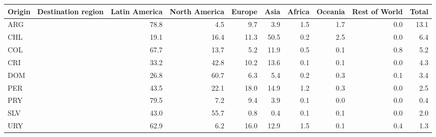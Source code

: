 \begin{tabular}{lrrrrrrrr}
\toprule
Origin \ Destination region & Latin America & North America & Europe & Asia & Africa & Oceania & Rest of World & Total \\
\midrule
ARG & 78.8 & 4.5 & 9.7 & 3.9 & 1.5 & 1.7 & 0.0 & 13.1 \\
CHL & 19.1 & 16.4 & 11.3 & 50.5 & 0.2 & 2.5 & 0.0 & 6.4 \\
COL & 67.7 & 13.7 & 5.2 & 11.9 & 0.5 & 0.1 & 0.8 & 5.2 \\
CRI & 33.2 & 42.8 & 10.2 & 13.6 & 0.1 & 0.1 & 0.0 & 4.3 \\
DOM & 26.8 & 60.7 & 6.3 & 5.4 & 0.2 & 0.3 & 0.1 & 3.4 \\
PER & 43.5 & 22.1 & 18.0 & 14.9 & 1.2 & 0.3 & 0.0 & 2.5 \\
PRY & 79.5 & 7.2 & 9.4 & 3.9 & 0.1 & 0.0 & 0.0 & 0.4 \\
SLV & 43.0 & 55.7 & 0.8 & 0.4 & 0.1 & 0.1 & 0.0 & 2.0 \\
URY & 62.9 & 6.2 & 16.0 & 12.9 & 1.5 & 0.1 & 0.4 & 1.3 \\
\bottomrule
\end{tabular}
